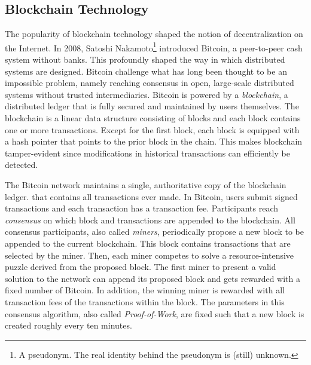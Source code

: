 

\subsection{Blockchain Technology}
The popularity of blockchain technology shaped the notion of decentralization on the Internet.
In 2008, Satoshi Nakamoto\footnote{A pseudonym. The real identity behind the pseudonym is (still) unknown.} introduced Bitcoin, a peer-to-peer cash system without banks.
This profoundly shaped the way in which distributed systems are designed.
Bitcoin challenge what has long been thought to be an impossible problem, namely reaching consensus in open, large-scale distributed systems without trusted intermediaries.
Bitcoin is powered by a \emph{blockchain}, a distributed ledger that is fully secured and maintained by users themselves.
The blockchain is a linear data structure consisting of blocks and each block contains one or more transactions.
Except for the first block, each block is equipped with a hash pointer that points to the prior block in the chain.
This makes blockchain tamper-evident since modifications in historical transactions can efficiently be detected.

The Bitcoin network maintains a single, authoritative copy of the blockchain ledger. that contains all transactions ever made.
In Bitcoin, users submit signed transactions and each transaction has a transaction fee.
Participants reach \emph{consensus} on which block and transactions are appended to the blockchain.
All consensus participants, also called \emph{miners}, periodically propose a new block to be appended to the current blockchain.
This block contains transactions that are selected by the miner.
Then, each miner competes to solve a resource-intensive puzzle derived from the proposed block.
The first miner to present a valid solution to the network can append its proposed block and gets rewarded with a fixed number of Bitcoin.
In addition, the winning miner is rewarded with all transaction fees of the transactions within the block.
The parameters in this consensus algorithm, also called \emph{Proof-of-Work}, are fixed such that a new block is created roughly every ten minutes.

